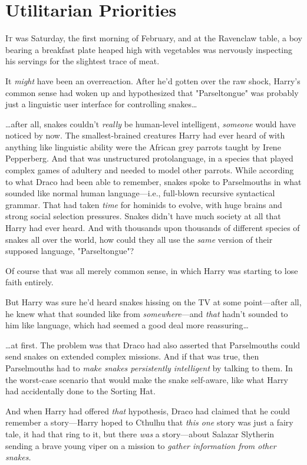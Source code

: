 \chapter{Utilitarian Priorities}

\lettrine{I}{t} was Saturday, 
the first morning of February, and at the Ravenclaw table, a boy bearing a 
breakfast plate heaped high with vegetables was nervously inspecting his 
servings for the slightest trace of meat.

It \emph{might} have been an overreaction. After he'd gotten over the raw 
shock, Harry's common sense had woken up and hypothesized that "Parseltongue" 
was probably just a linguistic user interface for controlling snakes{\ldots}

{\ldots}after all, snakes couldn't \emph{really} be human-level intelligent, 
\emph{someone} would have noticed by now. The smallest-brained creatures Harry 
had ever heard of with anything like linguistic ability were the African grey 
parrots taught by Irene Pepperberg. And that was unstructured protolanguage, in 
a species that played complex games of adultery and needed to model other 
parrots. While according to what Draco had been able to remember, snakes spoke 
to Parselmouths in what sounded like normal human language---i.e., full-blown 
recursive syntactical grammar. That had taken \emph{time} for hominids to 
evolve, with huge brains and strong social selection pressures. Snakes didn't 
have much society at all that Harry had ever heard. And with thousands upon 
thousands of different species of snakes all over the world, how could they all 
use the \emph{same} version of their supposed language, "Parseltongue"?

Of course that was all merely common sense, in which Harry was starting to lose 
faith entirely.

But Harry was sure he'd heard snakes hissing on the TV at some point---after 
all, he knew what that sounded like from \emph{somewhere}---and \emph{that} 
hadn't sounded to him like language, which had seemed a good deal more 
reassuring{\ldots}

{\ldots}at first. The problem was that Draco had also asserted that 
Parselmouths could send snakes on extended complex missions. And if that was 
true, then Parselmouths had to \emph{make snakes persistently intelligent} by 
talking to them. In the worst-case scenario that would make the snake 
self-aware, like what Harry had accidentally done to the Sorting Hat.

And when Harry had offered \emph{that} hypothesis, Draco had claimed that he 
could remember a story---Harry hoped to Cthulhu that \emph{this one} story was 
just a fairy tale, it had that ring to it, but there \emph{was} a story---about 
Salazar Slytherin sending a brave young viper on a mission to \emph{gather 
information from other snakes.}

